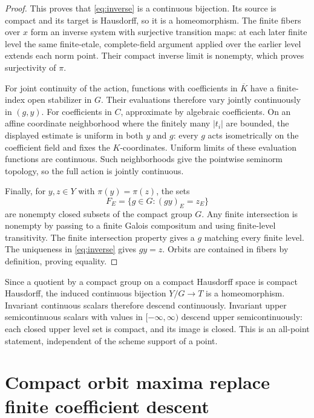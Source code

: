 \documentclass[11pt]{article}
\theoremstyle{remark}
\begin{document}
\begin{proof}
This proves that \eqref{eq:inverse} is a continuous bijection.
Its source is compact and its target is Hausdorff, so it is a
homeomorphism. The finite fibers over $x$ form an inverse system
with surjective transition maps: at each later finite level the same
finite-etale, complete-field argument applied over the earlier level
extends each norm point. Their compact inverse limit is nonempty,
which proves surjectivity of $\pi$.

For joint continuity of the action, functions with coefficients in
$\overline K$ have a finite-index open stabilizer in $G$.
Their evaluations therefore vary jointly continuously in $(g,y)$.
For coefficients in $C$, approximate by algebraic coefficients.
On an affine coordinate neighborhood where the finitely many $|t_i|$
are bounded, the displayed estimate is uniform in both $y$ and $g$:
every $g$ acts isometrically on the coefficient field and fixes the
$K$-coordinates. Uniform limits of these evaluation functions are
continuous. Such neighborhoods give the pointwise seminorm topology,
so the full action is jointly continuous.

Finally, for $y,z\in Y$ with $\pi(y)=\pi(z)$, the sets
\[
 F_E=\{g\in G:(gy)_E=z_E\}
\]
are nonempty closed subsets of the compact group $G$. Any finite
intersection is nonempty by passing to a finite Galois compositum and
using finite-level transitivity. The finite intersection property
gives a $g$ matching every finite level. The uniqueness in
\eqref{eq:inverse} gives $gy=z$. Orbits are contained in fibers by
definition, proving equality.
\end{proof}

Since a quotient by a compact group on a compact Hausdorff space is
compact Hausdorff, the induced continuous bijection $Y/G\to T$ is a
homeomorphism. Invariant continuous scalars therefore descend
continuously. Invariant upper semicontinuous scalars with values in
$[-\infty,\infty)$ descend upper semicontinuously: each closed upper
level set is compact, and its image is closed. This is an all-point
statement, independent of the scheme support of a point.

\section{Compact orbit maxima replace finite coefficient descent}
\end{document}
